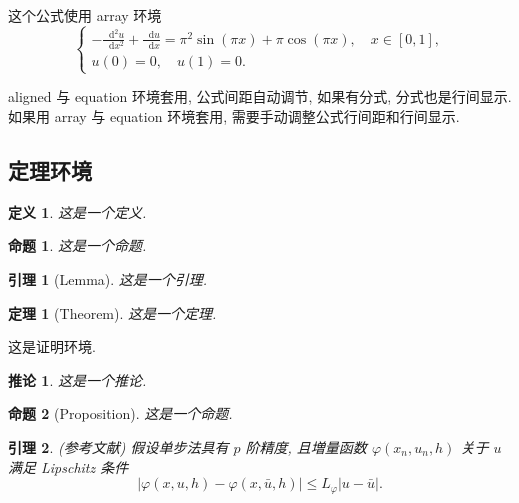 \documentclass[12pt,final]{article}
\makeatletter
\numberwithin{equation}{section}
\numberwithin{figure}{section}
\numberwithin{table}{section}
\theoremstyle{plain}
\newtheorem{definition}{定义}[section]
\newtheorem{proposition}{命题}[section]
\newtheorem{lemma}{引理}[section]
\newtheorem{theorem}{定理}[section]
\newtheorem{corollary}{推论}[section]
\renewcommand{\proofname}{证明}
\renewenvironment{proof}[1][\proofname]{\par
  \pushQED{\qed}%
  \normalfont \topsep6\p@\@plus6\p@\relax
  \trivlist\item[\hskip\labelsep
  \bfseries #1\@addpunct{\,:\,}]\ignorespaces
}{%
  \popQED\endtrivlist\@endpefalse
}
\newcommand{\dif}{\mathop{}\!\mathrm{d}}
\makeatother
\begin{document}
这个公式使用 array 环境
\begin{equation}\label{eq:arrayEq}
\left\{\begin{array}{l}
\displaystyle
-\frac{{\dif}^{2} u}{\dif x^{2}}+\frac{\dif u}{\dif x}=\pi^{2} \sin (\pi x)+\pi \cos (\pi x),\quad x \in [0,1], \\[6pt]
u(0)=0,\quad u(1)=0.
\end{array} \right.
\end{equation}

aligned 与 equation 环境套用, 公式间距自动调节, 如果有分式, 分式也是行间显示. 如果用 array 与 equation 环境套用, 需要手动调整公式行间距和行间显示.


\subsection{定理环境}

\begin{definition}\label{def:foo}
这是一个定义.
\end{definition}

\begin{proposition}\label{prop:foo}
这是一个命题.
\end{proposition}

\begin{lemma}[Lemma]\label{lmm:foo}
这是一个引理.
\end{lemma}

\begin{theorem}[Theorem]\label{thm:foo}
这是一个定理.
\end{theorem}
\begin{proof}
这是证明环境.
\end{proof}

\begin{corollary}\label{cor:foo}
这是一个推论.
\end{corollary}

\begin{proposition}[Proposition]
这是一个命题.
\end{proposition}

\begin{lemma}\label{lmm:convergence} {\rm (\textit{参考文献}\cite{LiLiu1997})}
假设单步法具有 $p$ 阶精度, 且増量函数 $\varphi(x_{n}, u_{n}, h)$ 关于 $u$ 满足 \textup{Lipschitz} 条件
\begin{equation}\label{eq:conver1}
|\varphi(x, u, h)-\varphi(x, \bar{u}, h)| \leqslant L_{\varphi}|u-\bar{u}|.
\end{equation}
\end{lemma}
\end{document}
